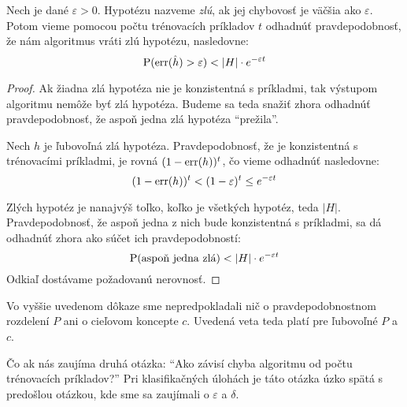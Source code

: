 \begin{theorem} \label{thm:badhypobound}
  Nech je dané $\varepsilon > 0$. Hypotézu nazveme \emph{zlú}, ak jej
  chybovosť je väčšia ako $\varepsilon$. Potom vieme pomocou počtu
  trénovacích príkladov $t$ odhadnúť pravdepodobnosť, že nám algoritmus
  vráti zlú hypotézu, nasledovne:
  $$\operatorname*{\mathrm{P}}(\mathrm{err}(\hat{h}) > \varepsilon) < |H| \cdot e^{-\varepsilon t}$$
\end{theorem}
\begin{proof}
  Ak žiadna zlá hypotéza nie je konzistentná s príkladmi, tak výstupom
  algoritmu nemôže byť zlá hypotéza. Budeme sa teda snažiť zhora odhadnúť
  pravdepodobnosť, že aspoň jedna zlá hypotéza ``prežila''.
  
  Nech $h$ je ľubovoľná zlá hypotéza. Pravdepodobnosť, že je konzistentná
  s trénovacími príkladmi, je rovná $(1 - \mathrm{err}(h))^t$, čo vieme odhadnúť
  nasledovne:
  $$(1 - \mathrm{err}(h))^t < (1 - \varepsilon)^t \leq e^{-\varepsilon t}$$
  
  Zlých hypotéz je nanajvýš toľko, koľko je všetkých hypotéz, teda
  $|H|$. Pravdepodobnosť, že aspoň jedna z nich bude konzistentná s
  príkladmi, sa dá odhadnúť zhora ako súčet ich pravdepodobností:
  $$\operatorname*{\mathrm{P}}(\text{aspoň jedna zlá}) < |H| \cdot e^{-\varepsilon t}$$
  Odkiaľ dostávame požadovanú nerovnosť.
\end{proof}
\begin{remark}
  Vo vyššie uvedenom dôkaze sme nepredpokladali nič o pravdepodobnostnom
  rozdelení $P$ ani o cieľovom koncepte $c$. Uvedená veta teda platí
  pre ľubovoľné $P$ a $c$.
\end{remark}

Čo ak nás zaujíma druhá otázka: ``Ako závisí chyba algoritmu od počtu
trénovacích príkladov?'' Pri klasifikačných úlohách je táto otázka úzko
spätá s predošlou otázkou, kde sme sa zaujímali o $\varepsilon$ a $\delta$.

